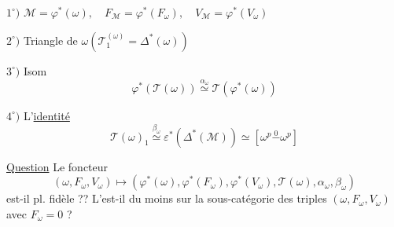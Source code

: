 $1^\circ)$ $\mathcal M=\varphi^*(\omega),\quad F_{\mathcal M}=\varphi^*(F_\omega),\quad V_{\mathcal M}=\varphi^*(V_\omega)$

$2^\circ)$ Triangle
 de $\omega$\quad $(\mathcal T_1^{(\omega)}=\Delta^*(\omega))$

$3^\circ)$ Isom 
\[\varphi^*(\mathcal T(\omega))\overset{\alpha_\omega}\simeq\mathcal T(\varphi^*(\omega))\]

$4^\circ)$ L'\uline{identité}
\[\mathcal T(\omega)_1\overset{\beta_\omega}\simeq\varepsilon^*(\Delta^*(\mathcal M))\simeq[\omega^p\overset0{\mathbin{-}}\omega^p]\]

\uline{Question} Le foncteur
\[
(\omega,F_\omega,V_\omega)\longmapsto(\varphi^*(\omega),\varphi^*(F_\omega),\varphi^*(V_\omega),\mathcal T(\omega),\alpha_\omega,\beta_\omega)
\]
est-il pl. fidèle ?? L'est-il du moins sur la sous-catégorie des triples $(\omega,F_\omega,V_\omega)$ avec $F_\omega=0$ ?

